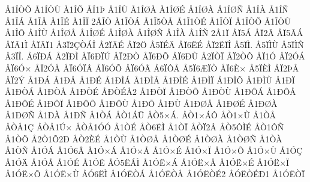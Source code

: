 {^^c51^^cd^^d2^^d5
^^c51^^cd^^d2^^d9
^^c51^^cd^^d5
^^c5^^cd1^^de
^^c51^^cd^^d9
^^c51^^cd^^d8^^c5
^^c51^^cd^^d8^^c9
^^c51^^cd^^d8^^c0
^^c51^^cd^^d8^^d1
^^c51^^cd^^c0
^^c51^^cd^^d1
^^c51^^ce^^c1
^^c51^^ce^^c5
^^c51^^ce^^c9
^^c51^^ce^^cf
2^^c5^^ce^^d2
^^c51^^ce^^d2^^c1
^^c51^^ce5^^d2^^c5
^^c51^^ce1^^d2^^c9
^^c51^^ce^^d2^^cf
^^c51^^ce^^d2^^d5
^^c51^^ce^^d2^^d9
^^c51^^ce^^d5
^^c51^^ce^^d9
^^c51^^ce^^d8^^c5
^^c51^^ce^^d8^^c9
^^c51^^ce^^d8^^c0
^^c51^^ce^^d8^^d1
^^c51^^ce^^c0
^^c51^^ce^^d1
2^^c51^^cf
^^c5^^cf5^^c1
^^c5^^cf2^^c2
^^c5^^cf5^^c2^^c1
^^c5^^cf^^c21^^cc
^^c5^^cf^^c2^^cf1
^^c53^^cf2^^c7^^d2^^c1^^ce
^^c52^^cf^^c4^^c9
^^c5^^cf2^^d6
^^c55^^cf^^c9^^c4
^^c5^^cf6^^cb^^c9
^^c5^^cf2^^cb^^cf^^ce
^^c55^^cf^^cc.
^^c55^^cf^^cc^^d9
^^c55^^cf^^cc^^d1
^^c53^^cf^^ce.
^^c56^^cf^^d0^^c1
^^c52^^cf^^d0^^cc
^^c5^^cf6^^d0^^cf^^da
^^c5^^cf2^^d0^^d2
^^c5^^cf6^^d0^^d5
^^c5^^cf6^^d0^^d9
^^c52^^cf^^d2^^cf
^^c5^^cf2^^d2^^d5
^^c5^^cf1^^d3
^^c5^^cf2^^d3^^c1
^^c5^^cf6^^d3^^d7
^^c5^^cf2^^d3^^c5
^^c5^^cf6^^d3^^cf^^c2
^^c5^^cf6^^d3^^d5
^^c5^^cf6^^d3^^c3
^^c56^^cf^^d4^^c5
^^c55^^cf6^^c6^^cf^^d2
^^c5^^cf6^^c8^^d7
^^c55^^cf^^c8^^cc
^^c5^^cf2^^de^^c5
^^c5^^cf2^^dd
^^c51^^d0^^c1
^^c51^^d0^^c5
^^c51^^d0^^c9
^^c51^^d0^^cc^^c1
^^c51^^d0^^cc^^c5
^^c51^^d0^^cc^^c9
^^c51^^d0^^cc^^cf
^^c51^^d0^^cc^^d5
^^c51^^d0^^cc^^d9
^^c51^^d0^^cf
^^c51^^d0^^d2^^c1
^^c51^^d0^^d2^^c5
^^c51^^d0^^d2^^c9
^^c5^^d0^^d2^^c9^^c52
^^c51^^d0^^d2^^cf
^^c51^^d0^^d2^^d5
^^c51^^d0^^d2^^d9
^^c51^^d0^^d4^^c1
^^c51^^d0^^d4^^c5
^^c51^^d0^^d4^^c9
^^c51^^d0^^d4^^cf
^^c51^^d0^^d4^^d5
^^c51^^d0^^d4^^d9
^^c51^^d0^^d5
^^c51^^d0^^d9
^^c51^^d0^^d8^^c5
^^c51^^d0^^d8^^c9
^^c51^^d0^^d8^^c0
^^c51^^d0^^d8^^d1
^^c51^^d0^^c0
^^c51^^d0^^d1
^^c51^^d2^^c1
^^c5^^d21^^c1^^dc
^^c5^^d25^^d7^^c1.
^^c5^^d21^^d7^^c1^^d4
^^c5^^d21^^d7^^d9
^^c51^^d2^^c5
^^c5^^d2^^c51^^c7
^^c5^^d2^^c51^^da^^d7
^^c5^^d2^^c51^^d3^^d3
^^c51^^d2^^c9
^^c5^^d26^^cb^^cc
^^c51^^d2^^cf
^^c5^^d2^^cf2^^c2
^^c5^^d25^^d4^^cc^^c9
^^c5^^d21^^d4^^d1
^^c51^^d2^^d5
^^c52^^d21^^d52^^d0
^^c5^^d22^^c8^^c9
^^c51^^d2^^d9
^^c51^^d2^^d8^^c5
^^c51^^d2^^d8^^c9
^^c51^^d2^^d8^^c0
^^c51^^d2^^d8^^d1
^^c51^^d2^^c0
^^c51^^d2^^d1
^^c51^^d3^^c1
^^c51^^d36^^c2
^^c51^^d3^^d7^^c1
^^c51^^d3^^d7^^c5
^^c51^^d3^^d7^^c9
^^c51^^d3^^d7^^cf
^^c51^^d3^^d7^^d5
^^c51^^d3^^d7^^d9
^^c51^^d3^^c7
^^c51^^d3^^c4
^^c51^^d3^^c5
^^c51^^d3^^c9
^^c51^^d3^^cb
^^c5^^d35^^cb^^c1^^cc
^^c51^^d3^^cb^^d7^^c1
^^c51^^d3^^cb^^d7^^c5
^^c51^^d3^^cb^^d7^^c9
^^c51^^d3^^cb^^d7^^cf
^^c51^^d3^^cb^^d7^^d5
^^c51^^d3^^cb^^d7^^d9
^^c5^^d36^^cb^^cc
^^c51^^d3^^cb^^d2^^c1
^^c51^^d3^^cb^^d2^^c5
^^c51^^d3^^cb^^d2^^c92
^^c5^^d3^^cb^^d2^^c9^^d01
^^c51^^d3^^cb^^d2^^cf
}
